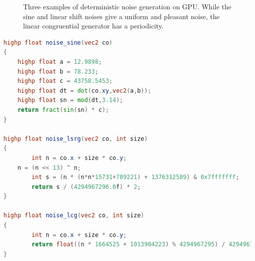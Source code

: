 \begin{figure}
\centering
{} 
\caption{Three examples of deterministic noise generation on GPU. While the sine and linear shift noises give a uniform and pleasant noise, the linear congruential generator has a periodicity.}
\label{fig:noises}
\end{figure}

\begin{lstlisting}[language=GLSL,label=lst:sinegenerator,caption={Three GLSL functions to generate random points on the GPU. The extra size parameter is the height of one layer of the radiance map texture.}]
highp float noise_sine(vec2 co)
{
    highp float a = 12.9898;
    highp float b = 78.233;
    highp float c = 43758.5453;
    highp float dt = dot(co.xy,vec2(a,b));
    highp float sn = mod(dt,3.14);
    return fract(sin(sn) * c);
}

highp float noise_lsrg(vec2 co, int size)
{
		int n = co.x + size * co.y;
    n = (n << 13) ^ n;
		int s = (n * (n*n*15731+789221) + 1376312589) & 0x7fffffff;
		return s / (4294967296.0f) * 2;
}

highp float noise_lcg(vec2 co, int size)
{
		int n = co.x + size * co.y;
		return float((n * 1664525 + 1013904223) % 4294967295) / 4294967296.0f;
}
\end{lstlisting}

